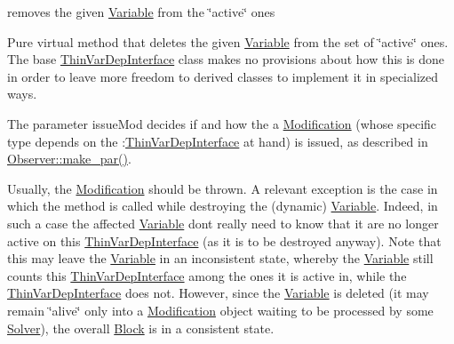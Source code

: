 removes the given \mbox{\hyperlink{class_s_m_spp__di__unipi__it_1_1_variable}{Variable}} from the \char`\"{}active\char`\"{} ones 

Pure virtual method that deletes the given \mbox{\hyperlink{class_s_m_spp__di__unipi__it_1_1_variable}{Variable}} from the set of \char`\"{}active\char`\"{} ones. The base \mbox{\hyperlink{class_s_m_spp__di__unipi__it_1_1_thin_var_dep_interface}{Thin\+Var\+Dep\+Interface}} class makes no provisions about how this is done in order to leave more freedom to derived classes to implement it in specialized ways.

The parameter issue\+Mod decides if and how the a \mbox{\hyperlink{class_s_m_spp__di__unipi__it_1_1_modification}{Modification}} (whose specific type depends on the \+:\mbox{\hyperlink{class_s_m_spp__di__unipi__it_1_1_thin_var_dep_interface}{Thin\+Var\+Dep\+Interface}} at hand) is issued, as described in \mbox{\hyperlink{class_s_m_spp__di__unipi__it_1_1_observer_a2d499ae38e5e95cf66cd71da32b0694a}{Observer\+::make\+\_\+par()}}.

Usually, the \mbox{\hyperlink{class_s_m_spp__di__unipi__it_1_1_modification}{Modification}} should be thrown. A relevant exception is the case in which the method is called while destroying the (dynamic) \mbox{\hyperlink{class_s_m_spp__di__unipi__it_1_1_variable}{Variable}}. Indeed, in such a case the affected \mbox{\hyperlink{class_s_m_spp__di__unipi__it_1_1_variable}{Variable}} don\textquotesingle{}t really need to know that it are no longer active on this \mbox{\hyperlink{class_s_m_spp__di__unipi__it_1_1_thin_var_dep_interface}{Thin\+Var\+Dep\+Interface}} (as it is to be destroyed anyway). Note that this may leave the \mbox{\hyperlink{class_s_m_spp__di__unipi__it_1_1_variable}{Variable}} in an inconsistent state, whereby the \mbox{\hyperlink{class_s_m_spp__di__unipi__it_1_1_variable}{Variable}} still counts this \mbox{\hyperlink{class_s_m_spp__di__unipi__it_1_1_thin_var_dep_interface}{Thin\+Var\+Dep\+Interface}} among the ones it is active in, while the \mbox{\hyperlink{class_s_m_spp__di__unipi__it_1_1_thin_var_dep_interface}{Thin\+Var\+Dep\+Interface}} does not. However, since the \mbox{\hyperlink{class_s_m_spp__di__unipi__it_1_1_variable}{Variable}} is deleted (it may remain \char`\"{}alive\char`\"{} only into a \mbox{\hyperlink{class_s_m_spp__di__unipi__it_1_1_modification}{Modification}} object waiting to be processed by some \mbox{\hyperlink{class_s_m_spp__di__unipi__it_1_1_solver}{Solver}}), the overall \mbox{\hyperlink{class_s_m_spp__di__unipi__it_1_1_block}{Block}} is in a consistent state. 


